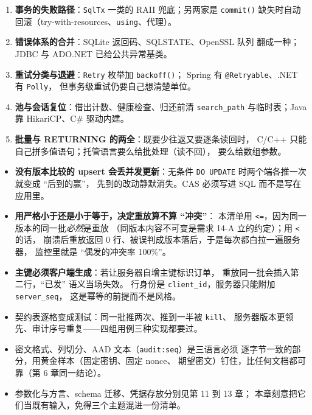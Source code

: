 \documentclass[12pt,a4paper,fontset=fandol]{ctexbook}
\newcommand{\Fn}[1]{\texttt{#1()}}
\newcommand{\Tp}[1]{\texttt{#1}}
\newcommand{\CSharp}{C\#}
\newcommand{\CppJava}{C/C++}
\begin{document}
\begin{guideline}[title=五件 \CppJava{} 要自己造、另两家白送的零件]
\begin{enumerate}
  \item \textbf{事务的失败路径}：\Tp{SqlTx} 一类的 RAII 兜底；另两家是
        \Fn{commit} 缺失时自动回滚（try-with-resources、\Tp{using}、代理）。
  \item \textbf{错误体系的合并}：SQLite 返回码、SQLSTATE、OpenSSL 队列
        翻成一种；JDBC 与 ADO.NET 已给公共异常基类。
  \item \textbf{重试分类与退避}：\Tp{Retry} 枚举加 \Fn{backoff}；
        Spring 有 \Tp{@Retryable}、.NET 有 \Tp{Polly}，
        但事务级重试仍要自己想清楚单位。
  \item \textbf{池与会话复位}：借出计数、健康检查、归还前清
        \Tp{search\_path} 与临时表；Java 靠 HikariCP、\CSharp{} 驱动内建。
  \item \textbf{批量与 RETURNING 的两全}：既要少往返又要逐条读回时，
        \CppJava{} 只能自己拼多值语句；托管语言要么给批处理（读不回），
        要么给数组参数。
\end{enumerate}
\end{guideline}

\begin{warning}[title=契约里最容易被省掉的一条：比较条件与行身份]
\begin{itemize}
  \item \textbf{没有版本比较的 upsert 会丢并发更新}：无条件
        \Tp{DO UPDATE} 时两个端各推一次就变成 ``后到的赢''，
        先到的改动静默消失。CAS 必须写进 SQL 而不是写在应用里。
  \item \textbf{用严格小于还是小于等于，决定重放算不算 ``冲突''}：
        本清单用 \Tp{<=}，因为同一版本的同一批\emph{必然}是重放
        （同版本内容不可变是需求 14-A 立的约定）；用 \Tp{<} 的话，
        崩溃后重放返回 0 行、被误判成版本落后，于是每次都白拉一遍服务器，
        监控里就是 ``偶发的冲突率 100\%''。
  \item \textbf{主键必须客户端生成}：若让服务器自增主键标识订单，
        重放同一批会插入第二行，``已发'' 语义当场失效。
        行身份是 \Tp{client\_id}，服务器只能附加 \Tp{server\_seq}，
        这是幂等的前提而不是风格。
\end{itemize}
\end{warning}

\begin{bestpractice}[title=把契约写成可测的东西]
\begin{itemize}
  \item 契约表逐格变成测试：同一批推两次、推到一半被 \Tp{kill}、
        服务器版本更领先、审计序号重复——四组用例三种实现都要过。
  \item 密文格式、列切分、AAD 文本（\Tp{audit:seq}）是三语言必须
        逐字节一致的部分，用黄金样本（固定密钥、固定 nonce、
        期望密文）钉住，比任何文档都可靠（第 6 章同一结论）。
  \item 参数化与方言、schema 迁移、凭据存放分别见第 11 到 13 章；
        本章刻意把它们当既有输入，免得三个主题混进一份清单。
\end{itemize}
\end{bestpractice}
\end{document}
